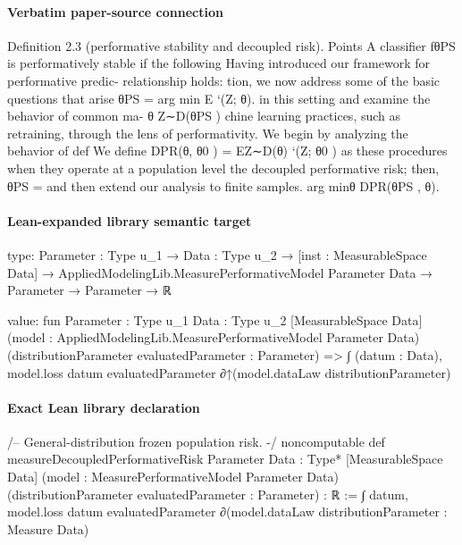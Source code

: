 \documentclass[10pt]{article}
\begin{document}
\paragraph{Verbatim paper-source connection}
\begin{ReviewVerbatim}
Deﬁnition 2.3 (performative stability and decoupled risk).              Points
A classiﬁer fθPS is performatively stable if the following           Having introduced our framework for performative predic-
relationship holds:                                                  tion, we now address some of the basic questions that arise
             θPS = arg min          E        `(Z; θ).                in this setting and examine the behavior of common ma-
                        θ        Z∼D(θPS )                           chine learning practices, such as retraining, through the lens
                                                                     of performativity. We begin by analyzing the behavior of
                                  def
We deﬁne DPR(θ, θ0 )     =    EZ∼D(θ) `(Z; θ0 ) as                   these procedures when they operate at a population level
the decoupled performative risk; then, θPS      =                    and then extend our analysis to ﬁnite samples.
arg minθ DPR(θPS , θ).
\end{ReviewVerbatim}



\paragraph{Lean-expanded library semantic target}
\begin{ReviewVerbatim}
type:
{Parameter : Type u_1} →
  {Data : Type u_2} →
    [inst : MeasurableSpace Data] →
      AppliedModelingLib.MeasurePerformativeModel Parameter Data → Parameter → Parameter → ℝ

value:
fun {Parameter : Type u_1} {Data : Type u_2} [MeasurableSpace Data]
    (model : AppliedModelingLib.MeasurePerformativeModel Parameter Data)
    (distributionParameter evaluatedParameter : Parameter) =>
  ∫ (datum : Data), model.loss datum evaluatedParameter ∂↑(model.dataLaw distributionParameter)
\end{ReviewVerbatim}

\paragraph{Exact Lean library declaration}
\begin{ReviewVerbatim}
/-- General-distribution frozen population risk. -/
noncomputable def measureDecoupledPerformativeRisk {Parameter Data : Type*} [MeasurableSpace Data]
    (model : MeasurePerformativeModel Parameter Data)
    (distributionParameter evaluatedParameter : Parameter) : ℝ :=
  ∫ datum, model.loss datum evaluatedParameter ∂(model.dataLaw distributionParameter : Measure Data)
\end{ReviewVerbatim}
\end{document}
